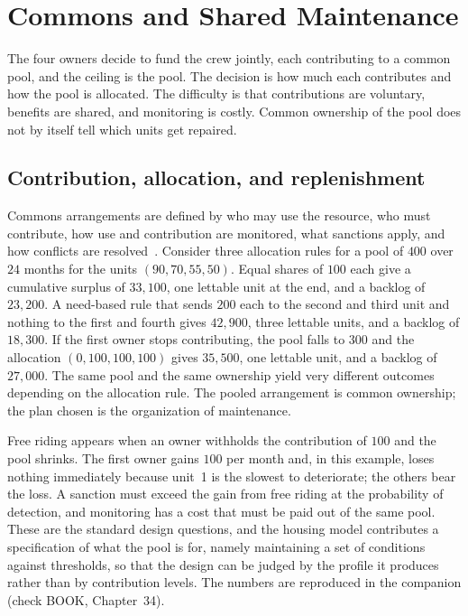 \chapter{Commons and Shared Maintenance}\label{ch:34}

The four owners decide to fund the crew jointly, each contributing to a common pool, and the ceiling is the pool. The decision is how much each contributes and how the pool is allocated. The difficulty is that contributions are voluntary, benefits are shared, and monitoring is costly. Common ownership of the pool does not by itself tell which units get repaired.

\section{Contribution, allocation, and replenishment}

Commons arrangements are defined by who may use the resource, who must contribute, how use and contribution are monitored, what sanctions apply, and how conflicts are resolved~\cite{ostrom1990}. Consider three allocation rules for a pool of $400$ over $24$ months for the units $(90,70,55,50)$. Equal shares of $100$ each give a cumulative surplus of $33{,}100$, one lettable unit at the end, and a backlog of $23{,}200$. A need-based rule that sends $200$ each to the second and third unit and nothing to the first and fourth gives $42{,}900$, three lettable units, and a backlog of $18{,}300$. If the first owner stops contributing, the pool falls to $300$ and the allocation $(0,100,100,100)$ gives $35{,}500$, one lettable unit, and a backlog of $27{,}000$. The same pool and the same ownership yield very different outcomes depending on the allocation rule. The pooled arrangement is common ownership; the plan chosen is the organization of maintenance.

Free riding appears when an owner withholds the contribution of $100$ and the pool shrinks. The first owner gains $100$ per month and, in this example, loses nothing immediately because unit~1 is the slowest to deteriorate; the others bear the loss. A sanction must exceed the gain from free riding at the probability of detection, and monitoring has a cost that must be paid out of the same pool. These are the standard design questions, and the housing model contributes a specification of what the pool is for, namely maintaining a set of conditions against thresholds, so that the design can be judged by the profile it produces rather than by contribution levels. The numbers are reproduced in the companion (check BOOK, Chapter~34).

